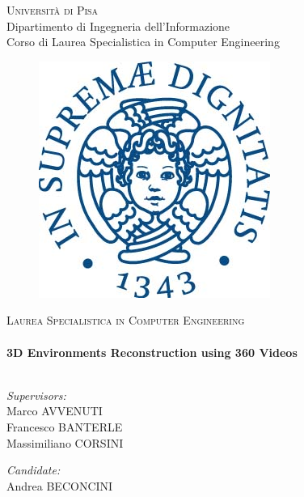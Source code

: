 \begin{titlepage}
\begin{center}
\textsc{\LARGE Università di Pisa}\\ %
Dipartimento di Ingegneria dell'Informazione\\
Corso di Laurea Specialistica in Computer Engineering\\[1cm]
\begin{figure}[h]
\centering
\includegraphics[scale=0.5]{img/Unipi_logo}
\end{figure}

\textsc{\Large Laurea Specialistica in Computer Engineering}\\[0.5cm] %

\HRule \\[0.4cm]
{\huge \bfseries 3D Environments Reconstruction using 360 Videos}\\[0.1cm] %
\HRule \\[1cm]
 
\begin{flushleft} \large
\emph{Supervisors:}\\
Marco AVVENUTI\\
Francesco BANTERLE \\
Massimiliano CORSINI%
\end{flushleft}

\begin{flushright} \large
\emph{Candidate:}\\
Andrea BECONCINI\\[1.5cm] %
\end{flushright}
 
 

\end{center}
\end{titlepage}
